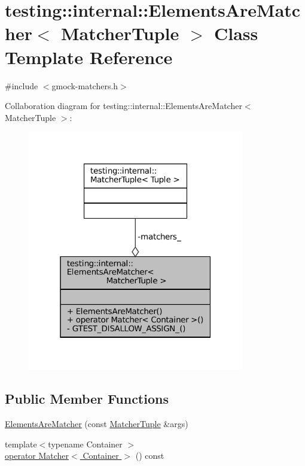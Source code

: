 \hypertarget{classtesting_1_1internal_1_1ElementsAreMatcher}{}\section{testing\+:\+:internal\+:\+:Elements\+Are\+Matcher$<$ Matcher\+Tuple $>$ Class Template Reference}
\label{classtesting_1_1internal_1_1ElementsAreMatcher}


{\ttfamily \#include $<$gmock-\/matchers.\+h$>$}



Collaboration diagram for testing\+:\+:internal\+:\+:Elements\+Are\+Matcher$<$ Matcher\+Tuple $>$\+:
\nopagebreak
\begin{figure}[H]
\begin{center}
\leavevmode
\includegraphics[width=268pt]{classtesting_1_1internal_1_1ElementsAreMatcher__coll__graph}
\end{center}
\end{figure}
\subsection*{Public Member Functions}
\begin{DoxyCompactItemize}
\item 
\hyperlink{classtesting_1_1internal_1_1ElementsAreMatcher_a563d71088c4909ab46987e3cd28f2ad6}{Elements\+Are\+Matcher} (const \hyperlink{structtesting_1_1internal_1_1MatcherTuple}{Matcher\+Tuple} \&args)
\item 
{\footnotesize template$<$typename Container $>$ }\\\hyperlink{classtesting_1_1internal_1_1ElementsAreMatcher_a6e6eaf8918c5d581b4b62ece23559be9}{operator Matcher$<$ Container $>$} () const
\end{DoxyCompactItemize}
